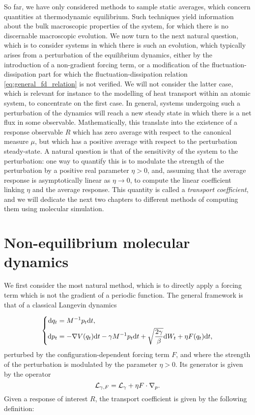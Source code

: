 So far, we have only considered methods to sample static averages, which concern quantities at thermodynamic equilibrium.
Such techniques yield information about the bulk macroscopic properties of the system, for which there is no discernable macroscopic evolution.
We now turn to the next natural question, which is to consider systems in which there is such an evolution,
 which typically arises from a perturbation of the equilibrium dynamics, either by the introduction of a non-gradient forcing term, 
 or a modification of the fluctuation-dissipation part for which the fluctuation-dissipation relation \eqref{eq:general_fd_relation} is not verified.
 We will not consider the latter case, which is relevant for instance to the modelling of heat transport within an atomic system, to concentrate on the first case.
 In general, systems undergoing such a perturbation of the dynamics will reach a new steady state in which there is a net flux in some observable.
 Mathematically, this translate into the existence of a response observable $R$ which has zero average with respect to the canonical measure $\mu$, but which has a positive average with respect to the perturbation steady-state.
 A natural question is that of the sensitivity of the system to the perturbation: one way to quantify this is to modulate the strength of the perturbation by a positive real parameter $\eta>0$, and,
  assuming that the average response is asymptotically linear as $\eta\to 0$, to compute the linear coefficient linking $\eta$ and the average response. 
  This quantity is called a \textit{transport coefficient}, and we will dedicate the next two chapters to different methods of computing them using molecular simulation.

\section{Non-equilibrium molecular dynamics}
We first consider the most natural method, which is to directly apply a forcing term which is not the gradient of a periodic function. 
The general framework is that of a classical Langevin dynamics

\begin{equation}
    \label{eq:general_nemd_dynamics}
    \left\{\begin{aligned}
        \text dq_t&=M^{-1}p_t\mathrm{d}t,\\
        \text dp_t&= -\nabla V(q_t)\mathrm{d}t -\gamma M^{-1}p_t\mathrm{d}t+\sqrt{\frac{2\gamma}\beta}\text dW_t +\eta F(q_t)\mathrm{d} t,
    \end{aligned}\right.
\end{equation}
perturbed by the configuration-dependent forcing term $F$, and where the strength of the perturbation is modulated by the parameter $\eta>0$.
Its generator is given by the operator 
\begin{equation}
    \label{eq:nemd_generator}
    \mathcal{L}_{\gamma,F}=\mathcal{L}_\gamma +\eta F\cdot \nabla_p.
\end{equation}
Given a response of interest $R$, the transport coefficient is given by the following definition:

